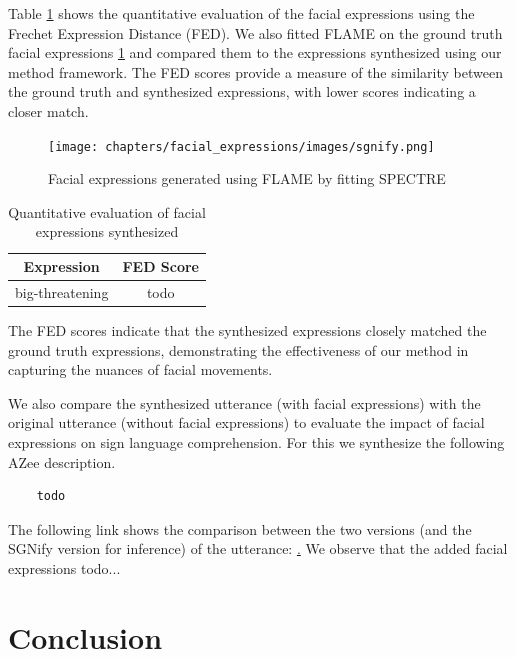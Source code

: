 \documentclass[../../main.tex]{subfiles}
\begin{document}
Table \ref{tab:facial_expressions_quantitative} shows the quantitative evaluation of the facial expressions using the Frechet Expression Distance (FED). We also fitted FLAME \cite{FLAME} on the  ground truth facial expressions \ref{fig:spectre} and compared them to the expressions synthesized using our method framework. The FED scores provide a measure of the similarity between the ground truth and synthesized expressions, with lower scores indicating a closer match.

\begin{figure}
    \centering
    \texttt{[image: chapters/facial\_expressions/images/sgnify.png]}
    \caption{Facial expressions generated using FLAME by fitting SPECTRE}
    \label{fig:spectre}
\end{figure}

\begin{table}
    \centering
    \begin{tabular}{|c|c|}
        \hline
        \textbf{Expression} & \textbf{FED Score} \\
        \hline
        big-threatening & todo \\
        \hline
    \end{tabular}
    \caption{Quantitative evaluation of facial expressions synthesized}
    \label{tab:facial_expressions_quantitative}
\end{table}

The FED scores indicate that the synthesized expressions closely matched the ground truth expressions, demonstrating the effectiveness of our method in capturing the nuances of facial movements.

We also compare the synthesized utterance (with facial expressions) with the original utterance (without facial expressions) to evaluate the impact of facial expressions on sign language comprehension. For this we synthesize the following AZee description.

\begin{verbatim}    
    todo
\end{verbatim}

The following link shows the comparison between the two versions (and the SGNify version for inference) of the utterance:  \href{todo}. We observe that the added facial expressions todo...

\section{Conclusion}
\label{ch:facial_expressions:conclusion}
\end{document}
